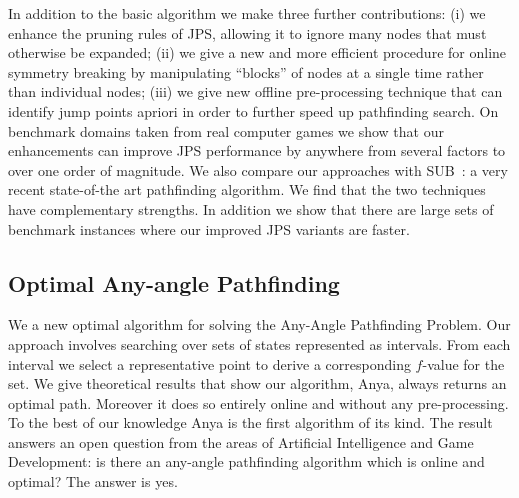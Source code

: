 In addition to the basic algorithm we make three further contributions: (i) we
enhance the pruning rules of JPS, allowing it to ignore many nodes that must
otherwise be expanded; (ii) we give a new and more efficient procedure for
online symmetry breaking by manipulating ``blocks'' of nodes at a single time
rather than individual nodes; (iii) we give new offline pre-processing
technique that can identify jump points apriori in order to further speed up
pathfinding search.
On benchmark domains taken from real computer games we show that our
enhancements can improve JPS performance by anywhere from several factors to
over one order of magnitude. We also compare our approaches with
SUB~\citep{urasKH13}: a very recent state-of-the art pathfinding algorithm. We
find that the two techniques have complementary strengths. In addition we show
that there are large sets of benchmark instances where our improved JPS
variants are faster.

\subsection{Optimal Any-angle Pathfinding}
\label{cha::intro::contributions::anya}
We a new optimal algorithm for solving the Any-Angle Pathfinding Problem.
Our approach involves searching over sets of states
represented as intervals. From each interval we select a representative point
to derive a corresponding $f$-value for the set.  We give theoretical results
that show our algorithm, Anya, always returns an optimal path. Moreover it
does so entirely online and without any pre-processing. To the best of our
knowledge Anya is the first algorithm of its kind.  The result answers an 
open question from the areas of Artificial Intelligence and Game Development: 
is there an any-angle pathfinding algorithm which is online and optimal?
The answer is yes.

